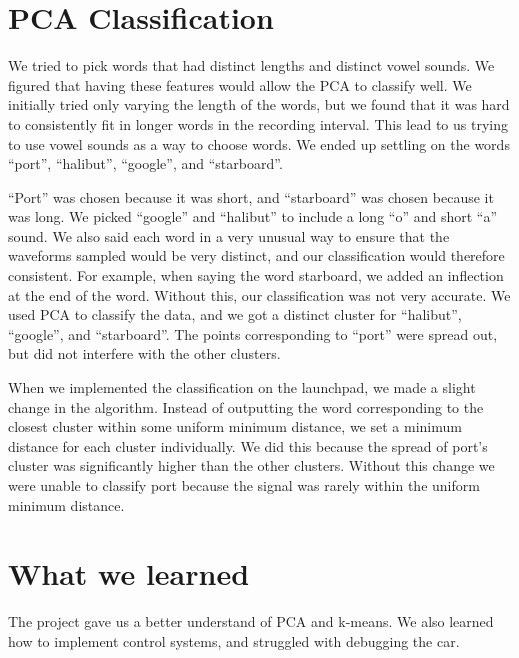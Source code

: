 \documentclass{article}
\begin{document}
\section*{PCA Classification}

We tried to pick words that had distinct lengths and distinct vowel sounds. We
figured that having these features would allow the PCA to classify well. We
initially tried only varying the length of the words, but we found that it was
hard to consistently fit in longer words in the recording interval. This lead
to us trying to use vowel sounds as a way to choose words. We ended up settling
on the words ``port'', ``halibut'', ``google'', and ``starboard''. 

``Port'' was chosen because it was short, and ``starboard'' was chosen because
it was long. We picked ``google'' and ``halibut'' to include a long ``o'' and
short ``a'' sound. We also said each word in a very unusual way to ensure that
the waveforms sampled would be very distinct, and our classification would
therefore consistent. For example, when saying the word starboard, we added an
inflection at the end of the word. Without this, our classification was not
very accurate.  We used PCA to classify the data, and we got a distinct cluster
for ``halibut'', ``google'', and ``starboard''. The points corresponding to
``port'' were spread out, but did not interfere with the other clusters. 

When we
implemented the classification on the launchpad, we made a slight change in the
algorithm.  Instead of outputting the word corresponding to the closest cluster
within some uniform minimum distance, we set a minimum distance for each
cluster individually. We did this because the spread of port's cluster was
significantly higher than the other clusters. Without this change we were
unable to classify port because the signal was rarely within the uniform
minimum distance.

\section*{What we learned}

The project gave us a better understand of PCA and k-means. We also learned how
to implement control systems, and struggled with debugging the car.
\end{document}
